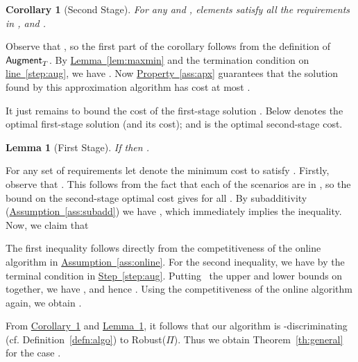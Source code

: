 \documentclass[11pt,letterpaper]{article}
\newcommand{\ignore}[1]{}
\newcommand{\lref}[2][]{\hyperref[#2]{#1~\ref*{#2}}}
\newtheorem{lemma}[theorem]{Lemma}
\newtheorem{corollary}[theorem]{Corollary}
\newenvironment{proof}{

\noindent{\bf Proof:}} {\hfill


}
\def\cov{\ensuremath{\Pi}\xspace}
\def\rcov{{\sf Robust(\cov)}\xspace}
\def\snd{\ensuremath {{\sf Augment}_T}\xspace}
\newcounter{note}[section]
\begin{document}
\begin{corollary}[Second Stage]\label{cor:mk-2nd}
  For any  and , elements  satisfy all the requirements in , and
  .
\end{corollary}
\begin{proof}
Observe that , so the first part of the corollary follows from the definition of \snd.  By
\lref[Lemma]{lem:maxmin} and the termination condition on
  \lref[line]{step:aug}, we have . Now
  \lref[Property]{ass:apx} guarantees that the solution  found by this approximation algorithm has cost at most
.
  \end{proof}

It just remains to bound the cost of the first-stage solution . Below  denotes the optimal
first-stage solution (and its cost); and  is the optimal second-stage cost.
\begin{lemma}[First Stage]\label{lem:mk-1st}
If  then .
\end{lemma}
\begin{proof}
For any set  of requirements let  denote the minimum cost to satisfy . Firstly, observe that
.
This follows from the fact that each of the  scenarios  are
  in , so the bound on the second-stage optimal cost gives
   for all . By
  subadditivity (\lref[Assumption]{ass:subadd}) we have
  ,
  which immediately implies the inequality. Now, we claim that
  
  The first inequality follows directly from the competitiveness of the
  online algorithm in \lref[Assumption]{ass:online}. For the second
  inequality, we have  by the terminal
  condition in \lref[Step]{step:aug}.  Putting~ the upper and lower bounds on
  together, we have ,
  and hence . Using the competitiveness of the online
  algorithm again, we obtain  .
\end{proof}

From \lref[Corollary]{cor:mk-2nd} and \lref[Lemma]{lem:mk-1st}, it follows that our algorithm is -discriminating (cf. Definition~\ref{defn:algo}) to \rcov. Thus we obtain
Theorem~\ref{th:general} for the case .

\ignore{outputs a solution of objective value at most , where the second stage augmentation algorithm is just the offline approximation from
\lref[Property]{ass:apx}. This completes the proof of \lref[Theorem]{th:general} for the case of just matroid
constraints (i.e. ). In \lref[Subsection]{sec:knapsack-mat}, we show how knapsack constraints can be reduced to
partition matroids, so as to obtain \lref[Theorem]{th:general}.}
\end{document}
